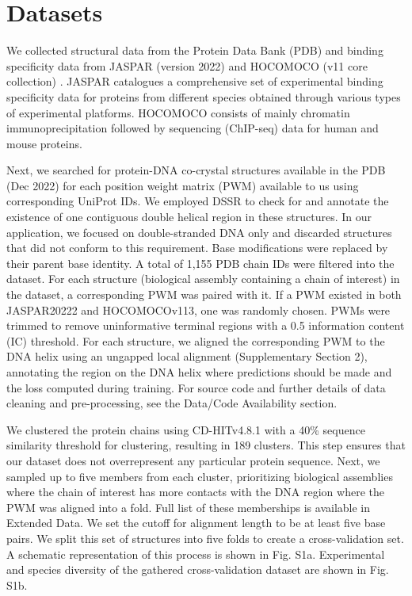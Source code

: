 \section{Datasets}
We collected structural data from the Protein Data Bank (PDB) \citep{Berman2000} and binding specificity data from JASPAR (version 2022) \citep{Jaime2022}  and HOCOMOCO (v11 core collection) \citep{kulakovskiy2018hocomoco}. JASPAR catalogues a comprehensive set of experimental binding specificity data for proteins from different species obtained through various types of experimental platforms. HOCOMOCO consists of mainly chromatin immunoprecipitation followed by sequencing (ChIP-seq) \citep{Park2009} data for human and mouse proteins.
\par
Next, we searched for protein-DNA co-crystal structures available in the PDB (Dec 2022) for each position weight matrix (PWM) available to us using corresponding UniProt IDs. We employed DSSR \citep{lu2015dssr} to check for and annotate the existence of one contiguous double helical region in these structures. In our application, we focused on double-stranded DNA only and discarded structures that did not conform to this requirement. Base modifications were replaced by their parent base identity. A total of 1,155 PDB chain IDs were filtered into the dataset. For each structure (biological assembly containing a chain of interest) in the dataset, a corresponding PWM was paired with it. If a PWM existed in both JASPAR20222 and HOCOMOCOv113, one was randomly chosen. PWMs were trimmed to remove uninformative terminal regions with a 0.5 information content (IC) threshold. For each structure, we aligned the corresponding PWM to the DNA helix using an ungapped local alignment (Supplementary Section 2), annotating the region on the DNA helix where predictions should be made and the loss computed during training. For source code and further details of data cleaning and pre-processing, see the Data/Code Availability section.
\par
We clustered the protein chains using CD-HITv4.8.1 \citep{fu2012cd} with a 40\% sequence similarity threshold for clustering, resulting in 189 clusters. This step ensures that our dataset does not overrepresent any particular protein sequence. Next, we sampled up to five members from each cluster, prioritizing biological assemblies where the chain of interest has more contacts with the DNA region where the PWM was aligned into a fold. Full list of these memberships is available in Extended Data. We set the cutoff for alignment length to be at least five base pairs. We split this set of structures into five folds to create a cross-validation set. A schematic representation of this process is shown in Fig. S1a. Experimental and species diversity of the gathered cross-validation dataset are shown in Fig. S1b.
